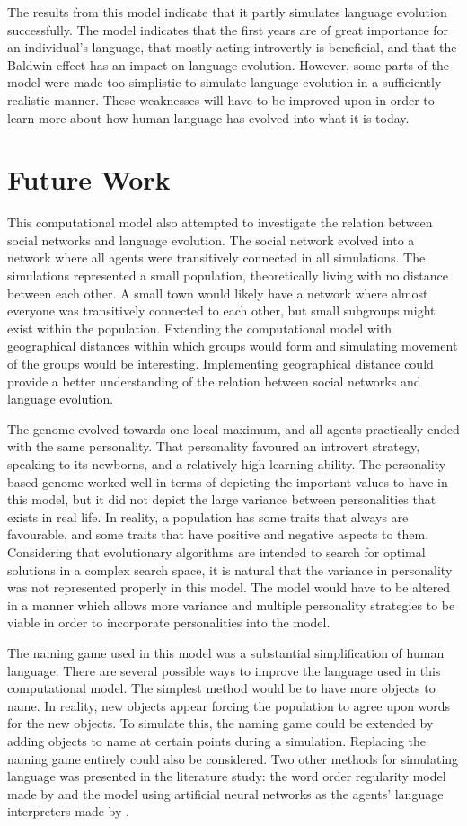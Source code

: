 The results from this model indicate that it partly simulates language evolution successfully. The model indicates that the first years are of great importance for an individual's language, that mostly acting introvertly is beneficial, and that the Baldwin effect has an impact on language evolution. However, some parts of the model were made too simplistic to simulate language evolution in a sufficiently realistic manner. These weaknesses will have to be improved upon in order to learn more about how human language has evolved into what it is today.
\section{Future Work}
This computational model also attempted to investigate the relation between social networks and language evolution. The social network evolved into a network where all agents were transitively connected in all simulations. The simulations represented a small population, theoretically living with no distance between each other. A small town would likely have a network where almost everyone was transitively connected to each other, but small subgroups might exist within the population. Extending the computational model with geographical distances within which groups would form and simulating movement of the groups would be interesting. Implementing geographical distance could provide a better understanding of the relation between social networks and language evolution.
 
The genome evolved towards one local maximum, and all agents practically ended with the same personality. That personality favoured an introvert strategy, speaking to its newborns, and a relatively high learning ability. The personality based genome worked well in terms of depicting the important values to have in this model, but it did not depict the large variance between personalities that exists in real life. In reality, a population has some traits that always are favourable, and some traits that have positive and negative aspects to them. Considering that evolutionary algorithms are intended to search for optimal solutions in a complex search space, it is natural that the variance in personality was not represented properly in this model. The model would have to be altered in a manner which allows more variance and multiple personality strategies to be viable in order to incorporate personalities into the model.  
 
The naming game used in this model was a substantial simplification of human language. There are several possible ways to improve the language used in this computational model. The simplest method would be to have more objects to name. In reality, new objects appear forcing the population to agree upon words for the new objects. To simulate this, the naming game could be extended by adding objects to name at certain points during a simulation. Replacing the naming game entirely could also be considered. Two other methods for simulating language was presented in the literature study: the word order regularity model made by \citet{gong2004computational} and the model using artificial neural networks as the agents’ language interpreters made by \citet{munroe2002learning}.


